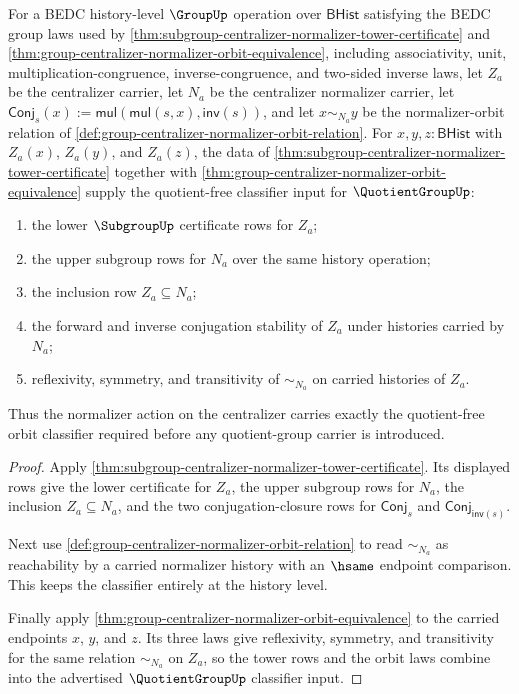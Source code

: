 \begin{theorem}
\label{thm:subgroup-normalizer-orbit-quotient-classifier}
For a BEDC history-level $\GroupUp$ operation over $\mathsf{BHist}$ satisfying
the BEDC group laws used by
\autoref{thm:subgroup-centralizer-normalizer-tower-certificate} and
\autoref{thm:group-centralizer-normalizer-orbit-equivalence}, including
associativity, unit, multiplication-congruence, inverse-congruence, and
two-sided inverse laws, let $Z_a$ be the centralizer carrier, let $N_a$ be the
centralizer normalizer carrier, let
$\mathsf{Conj}_s(x):=\mathsf{mul}(\mathsf{mul}(s,x),\mathsf{inv}(s))$, and let
$x\sim_{N_a}y$ be the normalizer-orbit relation of
\autoref{def:group-centralizer-normalizer-orbit-relation}. For
$x,y,z:\mathsf{BHist}$ with $Z_a(x)$, $Z_a(y)$, and $Z_a(z)$, the data of
\autoref{thm:subgroup-centralizer-normalizer-tower-certificate} together with
\autoref{thm:group-centralizer-normalizer-orbit-equivalence} supply the
quotient-free classifier input for $\QuotientGroupUp$:
\begin{enumerate}
\item the lower $\SubgroupUp$ certificate rows for $Z_a$;
\item the upper subgroup rows for $N_a$ over the same history operation;
\item the inclusion row $Z_a\subseteq N_a$;
\item the forward and inverse conjugation stability of $Z_a$ under histories
carried by $N_a$;
\item reflexivity, symmetry, and transitivity of $\sim_{N_a}$ on carried
histories of $Z_a$.
\end{enumerate}
Thus the normalizer action on the centralizer carries exactly the
quotient-free orbit classifier required before any quotient-group carrier is
introduced.
\end{theorem}
\begin{proof}
Apply
\autoref{thm:subgroup-centralizer-normalizer-tower-certificate}. Its displayed
rows give the lower certificate for $Z_a$, the upper subgroup rows for $N_a$,
the inclusion $Z_a\subseteq N_a$, and the two conjugation-closure rows for
$\mathsf{Conj}_s$ and $\mathsf{Conj}_{\mathsf{inv}(s)}$.

Next use
\autoref{def:group-centralizer-normalizer-orbit-relation} to read
$\sim_{N_a}$ as reachability by a carried normalizer history with an $\hsame$
endpoint comparison. This keeps the classifier entirely at the history level.

Finally apply
\autoref{thm:group-centralizer-normalizer-orbit-equivalence} to the carried
endpoints $x$, $y$, and $z$. Its three laws give reflexivity, symmetry, and
transitivity for the same relation $\sim_{N_a}$ on $Z_a$, so the tower rows and
the orbit laws combine into the advertised $\QuotientGroupUp$ classifier input.
\end{proof}


